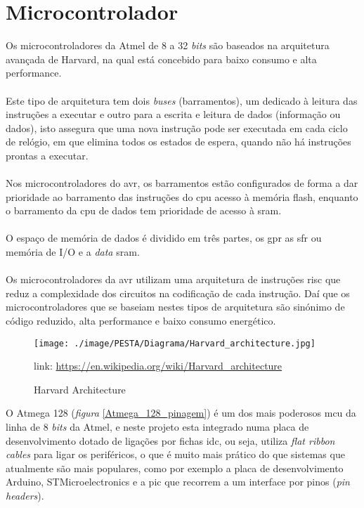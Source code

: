 \section{Microcontrolador}
Os microcontroladores da Atmel de 8 a 32 \textit{bits} são baseados na arquitetura avançada de Harvard, na qual está concebido para baixo consumo e alta performance.
\\
\\
Este tipo de arquitetura tem dois \textit{buses} (barramentos), um dedicado à leitura das instruções a executar e outro para a escrita e leitura de dados (informação ou dados), isto assegura que uma nova instrução pode ser executada em cada ciclo de relógio, em que elimina todos os estados de espera, quando não há instruções prontas a executar.
\\
\\
Nos microcontroladores do \ac{avr}, os barramentos estão configurados de forma a dar prioridade ao barramento das instruções do \ac{cpu} acesso à memória flash, enquanto o barramento da \acs{cpu} de dados tem prioridade de acesso à \ac{sram}.
\\
\\
O espaço de memória de dados é dividido em três partes, os \ac{gpr} as \ac{sfr} ou memória de I/O e a \textit{data} \acs{sram}.
\\
\\
Os microcontroladores da \acs{avr} utilizam uma arquitetura de instruções \ac{risc} que reduz a complexidade dos circuitos na codificação de cada instrução. Daí que os microcontroladores que se baseiam nestes tipos de arquitetura são sinónimo de código reduzido, alta performance e baixo consumo energético.
\begin{figure}[H]
	\centering
	\texttt{[image: ./image/PESTA/Diagrama/Harvard\_architecture.jpg]}
	\caption{Harvard Architecture}
	\label{Harvard_architecture}
	\vspace{.1cm}
	\qquad link: \url{https://en.wikipedia.org/wiki/Harvard_architecture}
\end{figure}
O Atmega 128 (\textit{figura} \ref{Atmega_128_pinagem}) é um dos mais poderosos \ac{mcu} da linha de 8 \textit{bits} da Atmel, e neste projeto esta integrado numa placa de desenvolvimento dotado de ligações por fichas \ac{idc}, ou seja, utiliza \textit{flat ribbon cables} para ligar os periféricos, o que é muito mais prático do que sistemas que atualmente são mais populares, como por exemplo a placa de desenvolvimento Arduino, STMicroelectronics e a \ac{pic} que recorrem a um interface por pinos (\textit{pin headers}).
